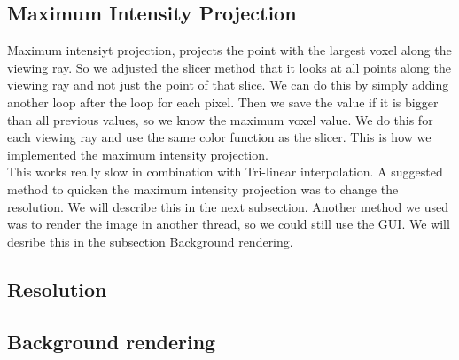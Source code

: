 \subsection{Maximum Intensity Projection}
Maximum intensiyt projection, projects the point with the largest voxel along the viewing ray. 
So we adjusted the slicer method that it looks at all points along the viewing ray and not just the point of that slice. 
We can do this by simply adding another loop after the loop for each pixel. 
Then we save the value if it is bigger than all previous values, so we know the maximum voxel value.
We do this for each viewing ray and use the same color function as the slicer. 
This is how we implemented the maximum intensity projection. \\
 This works really slow in combination with Tri-linear interpolation.
 A suggested method to quicken the maximum intensity projection was to change the resolution. 
 We will describe this in the next subsection. 
 Another method we used was to render the image in another thread, so we could still use the GUI.
We will desribe this in the subsection Background rendering.
\subsection{Resolution}

\subsection{Background rendering}